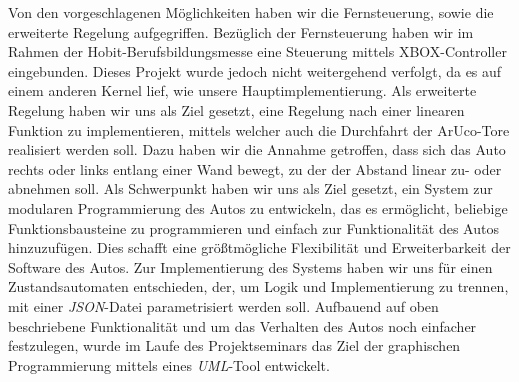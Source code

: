 Von den vorgeschlagenen Möglichkeiten haben wir die Fernsteuerung, sowie die erweiterte Regelung aufgegriffen. Bezüglich der Fernsteuerung haben wir im Rahmen der Hobit-Berufsbildungsmesse eine Steuerung mittels XBOX-Controller eingebunden. Dieses Projekt wurde jedoch nicht weitergehend verfolgt, da es auf einem anderen Kernel lief, wie unsere Hauptimplementierung. 
Als erweiterte Regelung haben wir uns als Ziel gesetzt, eine Regelung nach einer linearen Funktion zu implementieren, mittels welcher auch die Durchfahrt der ArUco-Tore realisiert werden soll. Dazu haben wir die Annahme getroffen, dass sich das Auto rechts oder links entlang einer Wand bewegt, zu der der Abstand linear zu- oder abnehmen soll. 
Als Schwerpunkt haben wir uns als Ziel gesetzt, ein System zur modularen Programmierung des Autos zu entwickeln, das es ermöglicht, beliebige Funktionsbausteine zu programmieren und einfach zur Funktionalität des Autos hinzuzufügen. Dies schafft eine größtmögliche Flexibilität und Erweiterbarkeit der Software des Autos. 
Zur Implementierung des Systems haben wir uns für einen Zustandsautomaten entschieden, der, um Logik und Implementierung zu trennen, mit einer \textit{JSON}-Datei parametrisiert werden soll. 
Aufbauend auf oben beschriebene Funktionalität und um das Verhalten des Autos noch einfacher festzulegen, wurde im Laufe des Projektseminars das Ziel der graphischen Programmierung mittels eines \textit{UML}-Tool entwickelt.